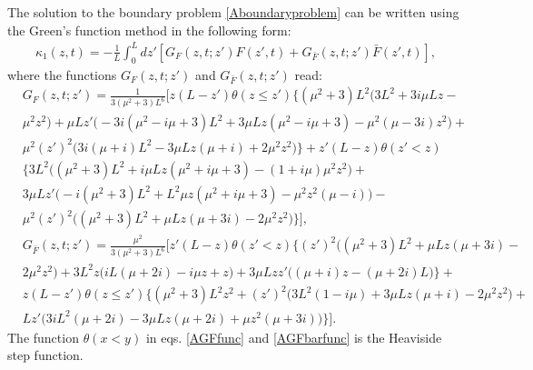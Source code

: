 \documentclass{article}
\begin{document}
The solution to the boundary problem \eqref{Aboundaryproblem} can be written using the Green's function method in the following form:
\begin{align}
    \kappa_{1}(z,t) = -\frac{1}{L}\int_{0}^{L}dz'\left[G_{F}(z,t;z')F(z',t) + G_{\bar{F}}(z,t;z')\bar{F}(z',t)\right],
\end{align}
where the functions $G_{F}(z,t;z')$ and $G_{\bar{F}}(z,t;z')$ read:
\begin{align}\label{AGFfunc}
    &G_{F}(z,t;z') = \frac{1}{3(\mu^{2}+3)L^{6}}\Bigg[z(L-z')\theta(z\leq z')\Big\{(\mu^{2}+3)L^{2}(3L^{2}+3i\mu L z - \nonumber\\ 
    &\mu^{2}z^{2})+\mu L z'\big(-3i(\mu^{2}-i\mu+3)L^{2}+3\mu L z(\mu^{2}-i\mu+3)-\mu^{2}(\mu-3i)z^{2}\big)+\nonumber\\
    &\mu^{2}(z')^{2}\big(3i(\mu+i)L^{2}-
    3\mu L z(\mu + i)+2\mu^{2}z^{2}\big)\Big\}+z'(L-z)\theta(z' < z)\nonumber\\
    &\Big\{3L^{2}\big((\mu^{2}+3)L^{2}+i\mu L z(\mu^{2}+i\mu + 3)-(1+i\mu)\mu^{2}z^{2}\big)+\nonumber\\
    &3\mu L z'\big(-i(\mu^{2}+3)L^{2}+L^{2}\mu z(\mu^{2}+i\mu +3)-\mu^{2}z^{2}(\mu-i)\big)-\nonumber\\
    &\mu^{2}(z')^{2}\big((\mu^{2}+3)L^{2}+\mu L z(\mu+3i)-2\mu^{2}z^{2}\big)\Big\}\Bigg],
\end{align}
\begin{align}\label{AGFbarfunc}
    &G_{\bar{F}}(z,t;z') = \frac{\mu^{2}}{3(\mu^{2}+3)L^{6}}\Bigg[z'(L-z)\theta(z' < z)\Big\{(z')^{2}\big((\mu^{2}+3)L^{2}+\mu L z(\mu+3i)-\nonumber\\
    &2\mu^{2}z^{2}\big)+3L^{2}z\big(iL(\mu+2i)-i\mu z+z\big)+3\mu L z z'\big((\mu+i)z-(\mu+2i)L\big)\Big\}+\nonumber\\
    &z(L-z')\theta(z \leq z')\Big\{(\mu^{2}+3)L^{2}z^{2}+(z')^{2}\big(3L^{2}(1-i\mu)+3\mu L z(\mu+i)-2\mu^{2} z^{2}\big)+\nonumber\\
    &L z'\big(3iL^{2}(\mu+2i)-3\mu L z(\mu + 2i)+\mu z^{2}(\mu + 3i)\big)\Big\}\Bigg].
\end{align}
The function $\theta(x < y)$ in eqs. \eqref{AGFfunc} and \eqref{AGFbarfunc} is the Heaviside step function. 
\end{document}
